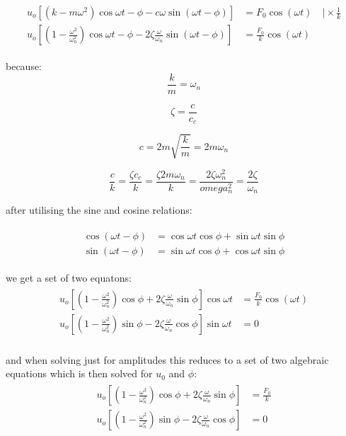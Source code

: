 \documentclass[10pt,b5paper,titlepage]{book}
\newenvironment{ematrix}
{
    \begin{eqnarray}
        \begin{aligned}
}
{
        \end{aligned}
    \end{eqnarray}
}
\begin{document}
\begin{ematrix}
    u_o \left[ \left(k - m \omega^2\right) \cos{\omega t - \phi} -
    c \omega \sin{\left( \omega t - \phi \right)} \right]
    &= F_0 \cos{\left( \omega t \right)} \quad \vert \times \frac{1}{k}\\
        u_o \left[ \left(1 - \frac{\omega^2}{\omega_n^2} \right) \cos{\omega t - \phi} -
        2 \zeta \frac{\omega}{\omega_n} \sin{\left( \omega t - \phi \right)} \right]
    &= \frac{F_0}{k} \cos{\left( \omega t \right)}
\end{ematrix}

because:
\begin{equation}
    \frac{k}{m} = \omega_n
\end{equation}

\begin{equation}
    \zeta = \frac{c}{c_c}
\end{equation}

\begin{equation}
    c = 2 m \sqrt{\frac{k}{m}} = 2 m \omega_n
\end{equation}

\begin{equation}
    \frac{c}{k} = \frac{\zeta c_c}{k} = \frac{\zeta 2 m \omega_n}{k}
    = \frac{2 \zeta \omega_n^2}{omega_n^2} = \frac{2 \zeta}{\omega_n}
\end{equation}

after utilising the sine and cosine relations:

\begin{ematrix}
    \cos{\left( \omega t - \phi \right)} &=
    \cos{\omega t} \cos{\phi} + \sin{\omega t} \sin{\phi}\\
    \sin{\left( \omega t - \phi \right)} &=
    \sin{\omega t} \cos{\phi} + \cos{\omega t} \sin{\phi}
\end{ematrix}

we get a set of two equatons:
\begin{ematrix}
    u_o \left[ \left(1 - \frac{\omega^2}{\omega_n^2} \right) \cos{\phi} +
    2 \zeta \frac{\omega}{\omega_n} \sin{\phi} \right] \cos{\omega t}
    &= \frac{F_0}{k} \cos{\left( \omega t \right)}\\
    u_o \left[ \left(1 - \frac{\omega^2}{\omega_n^2} \right) \sin{\phi} -
    2 \zeta \frac{\omega}{\omega_n} \cos{\phi} \right] \sin{\omega t}
    &= 0\\
\end{ematrix}

and when solving just for amplitudes this reduces to a set of two algebraic equations
which is then solved for $ u_0 $ and $ \phi $:
\begin{ematrix}
    u_o \left[ \left(1 - \frac{\omega^2}{\omega_n^2} \right) \cos{\phi} +
    2 \zeta \frac{\omega}{\omega_n} \sin{\phi} \right]
    &= \frac{F_0}{k}\\
    u_o \left[ \left(1 - \frac{\omega^2}{\omega_n^2} \right) \sin{\phi} -
    2 \zeta \frac{\omega}{\omega_n} \cos{\phi} \right]
    &= 0\\
\end{ematrix}
\end{document}

